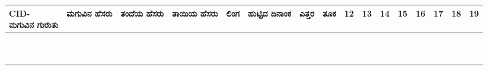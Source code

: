 ﻿\documentclass[12pt]{article}
\newcommand{\kn}[1]{%
{\fontspec[Script=Kannada]{Kedage}%
#1
}}
\begin{document}
\begin{tabular}{|l|p{3cm}|p{3cm}|p{3cm}|p{1.5cm}|p{1.5cm}|l|l|l|l|l|l|l|l|l|l|}
\makecell[b]{CID-\\ \kn{ಮಗುವಿನ ಗುರುತು}} & \kn{ಮಗುವಿನ ಹೆಸರು} & \kn{ತಂದೆಯ ಹೆಸರು} & \kn{ತಾಯಿಯ ಹೆಸರು} & \kn{ಲಿಂಗ} & \kn{ಹುಟ್ಟಿದ ದಿನಾಂಕ} & \kn{ಎತ್ತರ} & \kn{ತೂಕ}& 12 & 13 & 14 & 15 & 16 & 17 & 18 & 19 \\ \hline
& &  &  &  &  &  & & & & & & & & & \\ \hline
& &  &  &  &  &  & & & & & & & & & \\ \hline
& &  &  &  &  &  & & & & & & & & & \\ \hline 
& &  &  &  &  &  & & & & & & & & & \\ \hline
& &  &  &  &  &  & & & & & & & & & \\ \hline
& &  &  &  &  &  & & & & & & & & & \\ \hline 
& &  &  &  &  &  & & & & & & & & & \\ \hline
& &  &  &  &  &  & & & & & & & & & \\ \hline
& &  &  &  &  &  & & & & & & & & & \\ \hline 
& &  &  &  &  &  & & & & & & & & & \\ \hline 

\end{tabular}

\pagebreak

\end{document}
